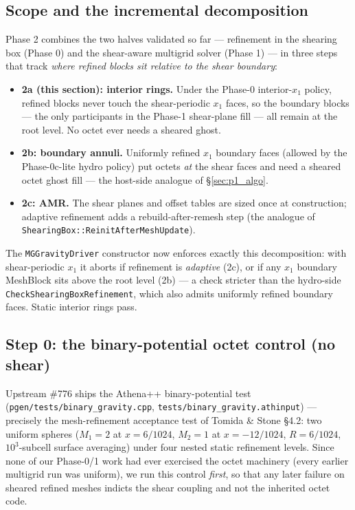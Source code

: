 \documentclass[11pt]{article}
\newcommand{\code}[1]{\texttt{#1}}
\begin{document}
\subsection{Scope and the incremental decomposition}
Phase 2 combines the two halves validated so far --- refinement in the shearing box
(Phase 0) and the shear-aware multigrid solver (Phase 1) --- in three steps that
track \emph{where refined blocks sit relative to the shear boundary}:
\begin{itemize}
  \item \textbf{2a (this section): interior rings.} Under the Phase-0 interior-$x_1$
        policy, refined blocks never touch the shear-periodic $x_1$ faces, so the
        boundary blocks --- the only participants in the Phase-1 shear-plane fill ---
        all remain at the root level. No octet ever needs a sheared ghost.
  \item \textbf{2b: boundary annuli.} Uniformly refined $x_1$ boundary faces (allowed
        by the Phase-0c-lite hydro policy) put octets \emph{at} the shear faces and
        need a sheared octet ghost fill --- the host-side analogue of
        \S\ref{sec:p1_algo}.
  \item \textbf{2c: AMR.} The shear planes and offset tables are sized once at
        construction; adaptive refinement adds a rebuild-after-remesh step
        (the analogue of \code{ShearingBox::ReinitAfterMeshUpdate}).
\end{itemize}
The \code{MGGravityDriver} constructor now enforces exactly this decomposition: with
shear-periodic $x_1$ it aborts if refinement is \emph{adaptive} (2c), or if any $x_1$
boundary MeshBlock sits above the root level (2b) --- a check stricter than the
hydro-side \code{CheckShearingBoxRefinement}, which also admits uniformly refined
boundary faces. Static interior rings pass.

\subsection{Step 0: the binary-potential octet control (no shear)}
\label{sec:p2_binary}
Upstream \#776 ships the Athena++ binary-potential test
(\code{pgen/tests/binary\_gravity.cpp}, \code{tests/binary\_gravity.athinput}) ---
precisely the mesh-refinement acceptance test of Tomida \& Stone \S4.2: two uniform
spheres ($M_1{=}2$ at $x{=}6/1024$, $M_2{=}1$ at $x{=}-12/1024$, $R = 6/1024$,
$10^3$-subcell surface averaging) under four nested static refinement levels. Since
none of our Phase-0/1 work had ever exercised the octet machinery (every earlier
multigrid run was uniform), we run this control \emph{first}, so that any later
failure on sheared refined meshes indicts the shear coupling and not the inherited
octet code.
\end{document}
